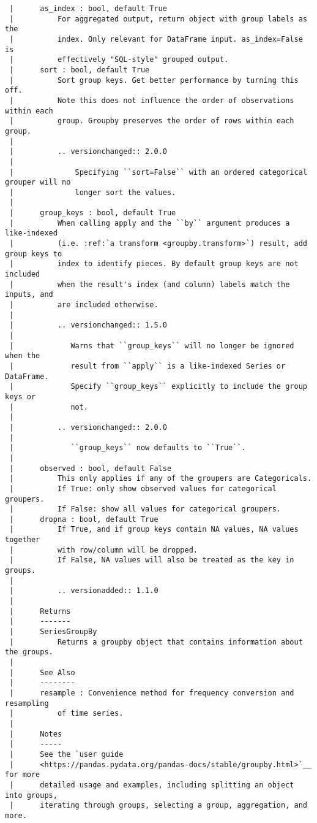 \documentclass[
  letterpaper,
  DIV=11,
  numbers=noendperiod]{scrreprt}
\begin{document}
\begin{verbatim}
 |      as_index : bool, default True
 |          For aggregated output, return object with group labels as the
 |          index. Only relevant for DataFrame input. as_index=False is
 |          effectively "SQL-style" grouped output.
 |      sort : bool, default True
 |          Sort group keys. Get better performance by turning this off.
 |          Note this does not influence the order of observations within each
 |          group. Groupby preserves the order of rows within each group.
 |      
 |          .. versionchanged:: 2.0.0
 |      
 |              Specifying ``sort=False`` with an ordered categorical grouper will no
 |              longer sort the values.
 |      
 |      group_keys : bool, default True
 |          When calling apply and the ``by`` argument produces a like-indexed
 |          (i.e. :ref:`a transform <groupby.transform>`) result, add group keys to
 |          index to identify pieces. By default group keys are not included
 |          when the result's index (and column) labels match the inputs, and
 |          are included otherwise.
 |      
 |          .. versionchanged:: 1.5.0
 |      
 |             Warns that ``group_keys`` will no longer be ignored when the
 |             result from ``apply`` is a like-indexed Series or DataFrame.
 |             Specify ``group_keys`` explicitly to include the group keys or
 |             not.
 |      
 |          .. versionchanged:: 2.0.0
 |      
 |             ``group_keys`` now defaults to ``True``.
 |      
 |      observed : bool, default False
 |          This only applies if any of the groupers are Categoricals.
 |          If True: only show observed values for categorical groupers.
 |          If False: show all values for categorical groupers.
 |      dropna : bool, default True
 |          If True, and if group keys contain NA values, NA values together
 |          with row/column will be dropped.
 |          If False, NA values will also be treated as the key in groups.
 |      
 |          .. versionadded:: 1.1.0
 |      
 |      Returns
 |      -------
 |      SeriesGroupBy
 |          Returns a groupby object that contains information about the groups.
 |      
 |      See Also
 |      --------
 |      resample : Convenience method for frequency conversion and resampling
 |          of time series.
 |      
 |      Notes
 |      -----
 |      See the `user guide
 |      <https://pandas.pydata.org/pandas-docs/stable/groupby.html>`__ for more
 |      detailed usage and examples, including splitting an object into groups,
 |      iterating through groups, selecting a group, aggregation, and more.

\end{verbatim}
\end{document}
